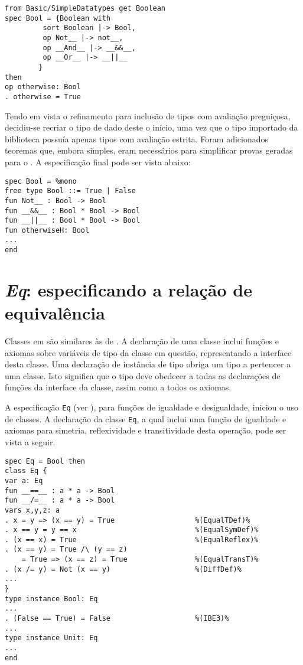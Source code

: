 \begin{Verbatim}
from Basic/SimpleDatatypes get Boolean
spec Bool = {Boolean with 
         sort Boolean |-> Bool,
         op Not__ |-> not__,
         op __And__ |-> __&&__,
         op __Or__ |-> __||__
        }
then
op otherwise: Bool
. otherwise = True
\end{Verbatim}

Tendo em vista o refinamento para inclusão de tipos com avaliação preguiçosa, decidiu-se recriar o tipo de dado deste o início, uma vez que o tipo importado da biblioteca \CASL possuía apenas tipos com avaliação estrita.
Foram adicionados teoremas que, embora simples, eram necessários para simplificar provas geradas para o \Isabelle.
A especificação final pode ser vista abaixo:

\begin{Verbatim}
spec Bool = %mono
free type Bool ::= True | False 
fun Not__ : Bool -> Bool
fun __&&__ : Bool * Bool -> Bool
fun __||__ : Bool * Bool -> Bool
fun otherwiseH: Bool      
...
end
\end{Verbatim}

\section{\textit{Eq}: especificando a relação de equivalência}
Classes em \HasCASL são similares às de \Haskell.
A declaração de uma classe inclui funções e axiomas sobre variáveis de tipo da classe em questão, representando a interface desta classe.
Uma declaração de instância de tipo obriga um tipo a pertencer a uma classe.
Isto significa que o tipo deve obedecer a todas as declarações de funções da interface da classe, assim como a todos os axiomas.

A especificação \Verb.Eq. (ver ), para funções de igualdade e desigualdade, iniciou o uso de classes.
A declaração da classe \Verb.Eq., a qual inclui uma função de igualdade e axiomas para simetria, reflexividade e transitividade desta operação, pode ser vista a seguir.

\begin{Verbatim}
spec Eq = Bool then
class Eq {
var a: Eq
fun __==__ : a * a -> Bool
fun __/=__ : a * a -> Bool
vars x,y,z: a
. x = y => (x == y) = True                   %(EqualTDef)%
. x == y = y == x                            %(EqualSymDef)%
. (x == x) = True                            %(EqualReflex)%
. (x == y) = True /\ (y == z)                
    = True => (x == z) = True                %(EqualTransT)%
. (x /= y) = Not (x == y)                    %(DiffDef)%
...
}                                            
type instance Bool: Eq                       
...
. (False == True) = False                    %(IBE3)%
...
type instance Unit: Eq                       
...
end
\end{Verbatim}


